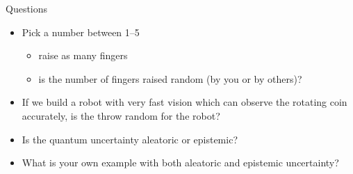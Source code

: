 \documentclass[english,t]{beamer}
\begin{document}
\begin{frame}{Questions}

  \begin{itemize}
  \item<1-> Pick a number between 1--5
    \begin{itemize}
    \item<2-> raise as many fingers 
    \item<3-> is the number of fingers raised random (by you or by others)?
    \end{itemize}
    \vspace{\baselineskip}
  \item<4-> If we build a robot with very fast vision which can observe
    the rotating coin accurately, is the throw random for the robot?
    \vspace{\baselineskip}
  \item<5-> Is the quantum uncertainty aleatoric or epistemic?
    \vspace{\baselineskip}
  \item<6-> What is your own example with both aleatoric and epistemic
    uncertainty?
  \end{itemize}
\end{frame}


\end{document}
